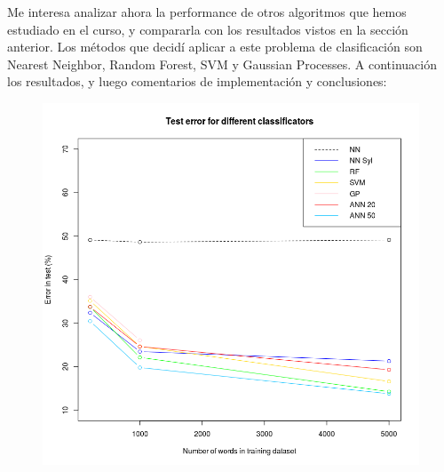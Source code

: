 \documentclass[paper=a4, fontsize=11pt]{scrartcl} %
\numberwithin{equation}{section} %
\numberwithin{figure}{section} %
\numberwithin{table}{section} %
\begin{document}
Me interesa analizar ahora la performance de otros algoritmos que hemos estudiado en el curso, y compararla con los resultados vistos en la sección anterior. Los métodos que decidí aplicar a este problema de clasificación son Nearest Neighbor, Random Forest, SVM y Gaussian Processes. A continuación los resultados, y luego comentarios de implementación y conclusiones:

\begin{center}
\begin{figure}[h!]
\includegraphics[width=170mm]{figure.png}
\end{figure}
\end{center}
\end{document}
